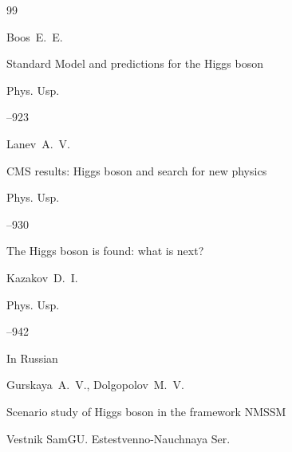 \EngRef





\begin{thebibliography}{99}






\by Boos~E.~E.

\paper Standard Model and predictions for the Higgs boson

\jour Phys. Usp. 


–923 







\by Lanev~A.~V.

\paper CMS results: Higgs boson and search for new physics

\jour Phys. Usp. 




–930







\paper The Higgs boson is found: what is next?

\by Kazakov~D.~I. 

\jour Phys. Usp.




–942





\lang In Russian

\by Gurskaya~A.~V., Dolgopolov~M.~V.

\paper Scenario study of Higgs boson in the framework NMSSM

\jour Vestnik SamGU. Estestvenno-Nauchnaya Ser.


\end{thebibliography}

